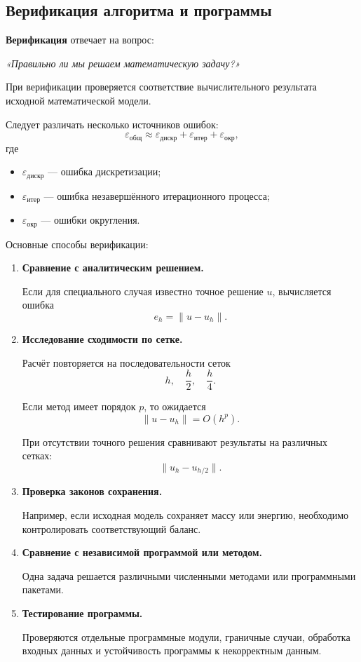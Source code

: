 \subsection{Верификация алгоритма и программы}

\textbf{Верификация} отвечает на вопрос:

\begin{center}
	\textit{«Правильно ли мы решаем математическую задачу?»}
\end{center}

При верификации проверяется соответствие вычислительного результата исходной математической модели.

Следует различать несколько источников ошибок:
\[
\varepsilon_{\text{общ}}
\approx
\varepsilon_{\text{дискр}}
+
\varepsilon_{\text{итер}}
+
\varepsilon_{\text{окр}},
\]
где
\begin{itemize}
	\item $\varepsilon_{\text{дискр}}$ --- ошибка дискретизации;
	\item $\varepsilon_{\text{итер}}$ --- ошибка незавершённого итерационного процесса;
	\item $\varepsilon_{\text{окр}}$ --- ошибки округления.
\end{itemize}

Основные способы верификации:

\begin{enumerate}
	\item \textbf{Сравнение с аналитическим решением.}
	
	Если для специального случая известно точное решение $u$, вычисляется ошибка
	\[
	e_h=\|u-u_h\|.
	\]
	
	\item \textbf{Исследование сходимости по сетке.}
	
	Расчёт повторяется на последовательности сеток
	\[
	h,\quad \frac{h}{2},\quad \frac{h}{4}.
	\]
	
	Если метод имеет порядок $p$, то ожидается
	\[
	\|u-u_h\| = O(h^p).
	\]
	
	При отсутствии точного решения сравнивают результаты на различных сетках:
	\[
	\|u_h-u_{h/2}\|.
	\]
	
	\item \textbf{Проверка законов сохранения.}
	
	Например, если исходная модель сохраняет массу или энергию, необходимо контролировать соответствующий баланс.
	
	\item \textbf{Сравнение с независимой программой или методом.}
	
	Одна задача решается различными численными методами или программными пакетами.
	
	\item \textbf{Тестирование программы.}
	
	Проверяются отдельные программные модули, граничные случаи, обработка входных данных и устойчивость программы к некорректным данным.
\end{enumerate}

